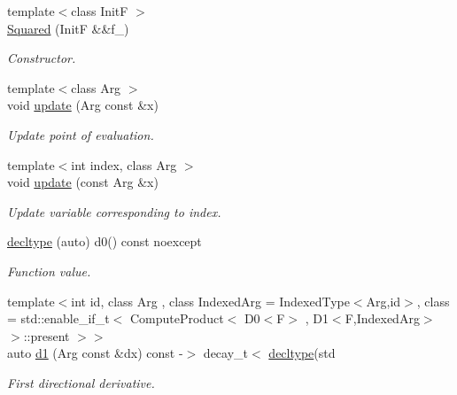 \begin{DoxyCompactItemize}
\item 
{\footnotesize template$<$class Init\-F $>$ }\\\hyperlink{structFunG_1_1MathematicalOperations_1_1Squared_accc8f4efa8c54b43c29d71890e8b8bdf}{\-Squared} (\-Init\-F \&\&f\-\_\-)
\begin{DoxyCompactList}\small\item\em \-Constructor. \end{DoxyCompactList}\item 
{\footnotesize template$<$class Arg $>$ }\\void \hyperlink{structFunG_1_1MathematicalOperations_1_1Squared_abea95d90dc29ac105c43f4eadde84cab}{update} (\-Arg const \&x)
\begin{DoxyCompactList}\small\item\em \-Update point of evaluation. \end{DoxyCompactList}\item 
{\footnotesize template$<$int index, class Arg $>$ }\\void \hyperlink{structFunG_1_1MathematicalOperations_1_1Squared_a1d890825175df9b79fd73bf8248496ad}{update} (const \-Arg \&x)
\begin{DoxyCompactList}\small\item\em \-Update variable corresponding to index. \end{DoxyCompactList}\item 
\hyperlink{structFunG_1_1MathematicalOperations_1_1Squared_af0560fc3c8a6eed252dfece751a8378d}{decltype} (auto) d0() const noexcept
\begin{DoxyCompactList}\small\item\em \-Function value. \end{DoxyCompactList}\item 
{\footnotesize template$<$int id, class Arg , class Indexed\-Arg  = \-Indexed\-Type$<$\-Arg,id$>$, class  = std\-::enable\-\_\-if\-\_\-t$<$ Compute\-Product$<$ D0$<$\-F$>$ , D1$<$\-F,\-Indexed\-Arg$>$ $>$\-::present $>$$>$ }\\auto \hyperlink{structFunG_1_1MathematicalOperations_1_1Squared_a3fdd893f4a01c7b78f9eba9301d53cce}{d1} (\-Arg const \&dx) const -\/$>$ decay\-\_\-t$<$ \hyperlink{structFunG_1_1MathematicalOperations_1_1Squared_af0560fc3c8a6eed252dfece751a8378d}{decltype}(std
\begin{DoxyCompactList}\small\item\em \-First directional derivative. \end{DoxyCompactList}\item 

\end{DoxyCompactItemize}
